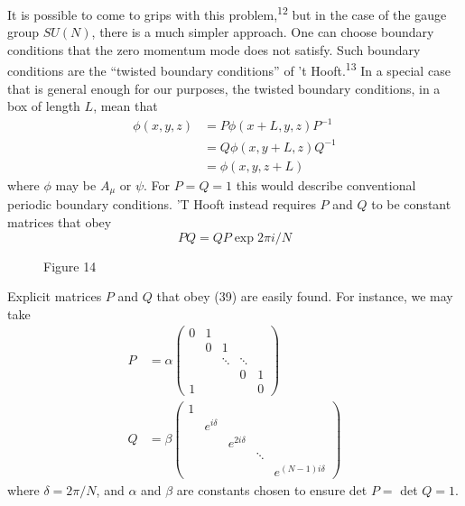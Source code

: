 It is possible to come to grips with this problem,\textsuperscript{12} but in the
case of the gauge group $SU(N)$, there is a much simpler approach.
One can choose boundary conditions that the zero momentum mode does
not satisfy. Such boundary conditions are the ``twisted boundary
conditions'' of 't Hooft.\textsuperscript{13} In a special case that is general enough
for our purposes, the twisted boundary conditions, in a box of length
$L$, mean that
\begin{equation}
\begin{aligned}
\phi(x,y,z) &= P \phi(x+L,y,z) P^{-1} \\
&= Q \phi(x,y+L,z) Q^{-1} \\
&= \phi(x,y,z+L)
\end{aligned}
\tag{38}
\end{equation}
where $\phi$ may be $A_\mu$ or $\psi$. For
$P = Q = 1$ this would describe conventional periodic boundary
conditions. 'T Hooft instead requires
$P$ and $Q$ to be constant matrices
that obey
\begin{equation}
PQ = QP \exp 2\pi i/N
\tag{39}
\end{equation}

\begin{figure}
\vspace{-2.8\baselineskip}
\centering
{}
\par\smallskip
Figure 14
\vspace{-0.8\baselineskip}
\end{figure}

Explicit matrices $P$ and $Q$ that
obey (39) are easily found. For
instance, we may take
\begin{equation}
\begin{aligned}
P &= \alpha
\left(
\begin{array}{ccccc}
0 & 1 & & & \\
& 0 & 1 & & \\
& & \ddots & \ddots & \\
& & & 0 & 1 \\
1 & & & & 0
\end{array}
\right) \\
Q &= \beta
\left(
\begin{array}{ccccc}
1 & & & & \\
& e^{i\delta} & & & \\
& & e^{2i\delta} & & \\
& & & \ddots & \\
& & & & e^{(N-1)i\delta}
\end{array}
\right)
\end{aligned}
\tag{40}
\end{equation}
where $\delta = 2\pi/N$, and $\alpha$ and $\beta$ are constants chosen to ensure det $P =$
det $Q = 1$.

